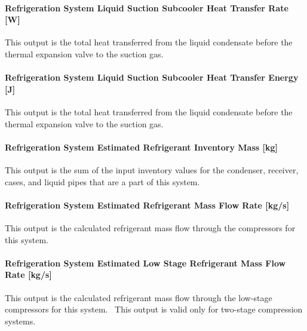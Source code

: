 \paragraph{Refrigeration System Liquid Suction Subcooler Heat Transfer Rate {[}W{]}}\label{refrigeration-system-liquid-suction-subcooler-heat-transfer-rate-w}

This output is the total heat transferred from the liquid condensate before the thermal expansion valve to the suction gas.

\paragraph{Refrigeration System Liquid Suction Subcooler Heat Transfer Energy {[}J{]}}\label{refrigeration-system-liquid-suction-subcooler-heat-transfer-energy-j}

This output is the total heat transferred from the liquid condensate before the thermal expansion valve to the suction gas.

\paragraph{Refrigeration System Estimated Refrigerant Inventory Mass {[}kg{]}}\label{refrigeration-system-estimated-refrigerant-inventory-mass-kg}

This output is the sum of the input inventory values for the condenser, receiver, cases, and liquid pipes that are a part of this system.

\paragraph{Refrigeration System Estimated Refrigerant Mass Flow Rate {[}kg/s{]}}\label{refrigeration-system-estimated-refrigerant-mass-flow-rate-kgs}

This output is the calculated refrigerant mass flow through the compressors for this system.

\paragraph{Refrigeration System Estimated Low Stage Refrigerant Mass Flow Rate {[}kg/s{]}}\label{refrigeration-system-estimated-low-stage-refrigerant-mass-flow-rate-kgs}

This output is the calculated refrigerant mass flow through the low-stage compressors for this system.~ This output is valid only for two-stage compression systems.

